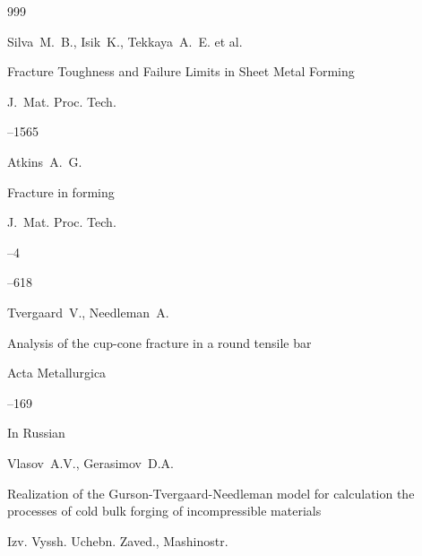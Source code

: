 \begin{thebibliography}{999}




\by Silva~M.~B., Isik~K., Tekkaya~A.~E. et al.

\paper Fracture Toughness and Failure Limits in Sheet Metal Forming

\jour J.~Mat. Proc. Tech.  




--1565






\by  Atkins~A.~G. 

\paper Fracture in forming  

\jour J.~Mat. Proc. Tech.



--4

--618




	


\by Tvergaard~V., Needleman~A. 

\paper Analysis of the cup-cone fracture in a round tensile bar

\jour Acta Metallurgica  




--169






\lang In Russian

\by Vlasov~A.V., Gerasimov~D.A. 

\paper Realization of the Gurson-Tvergaard-Needleman model for calculation the processes of cold bulk forging of incompressible materials

\jour Izv. Vyssh. Uchebn. Zaved., Mashinostr.


\end{thebibliography}
